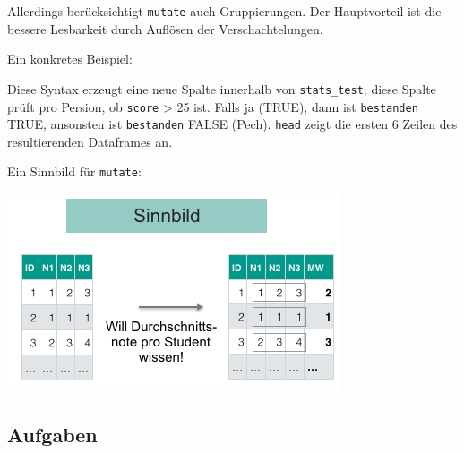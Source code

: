 \documentclass[12pt,ngerman,]{book}
\newenvironment{Shaded}{\begin{snugshade}}{\end{snugshade}}
\newcommand{\KeywordTok}[1]{\textcolor[rgb]{0.13,0.29,0.53}{\textbf{{#1}}}}
\newcommand{\DataTypeTok}[1]{\textcolor[rgb]{0.13,0.29,0.53}{{#1}}}
\newcommand{\DecValTok}[1]{\textcolor[rgb]{0.00,0.00,0.81}{{#1}}}
\newcommand{\StringTok}[1]{\textcolor[rgb]{0.31,0.60,0.02}{{#1}}}
\newcommand{\CommentTok}[1]{\textcolor[rgb]{0.56,0.35,0.01}{\textit{{#1}}}}
\newcommand{\NormalTok}[1]{{#1}}
\renewenvironment{Shaded}{\begin{kframe}}{\end{kframe}}
\begin{document}
Allerdings berücksichtigt \texttt{mutate} auch Gruppierungen. Der
Hauptvorteil ist die bessere Lesbarkeit durch Auflösen der
Verschachtelungen.

Ein konkretes Beispiel:

\begin{Shaded}
\end{Shaded}

Diese Syntax erzeugt eine neue Spalte innerhalb von
\texttt{stats\_test}; diese Spalte prüft pro Persion, ob \texttt{score}
\textgreater{} 25 ist. Falls ja (TRUE), dann ist \texttt{bestanden}
TRUE, ansonsten ist \texttt{bestanden} FALSE (Pech). \texttt{head} zeigt
die ersten 6 Zeilen des resultierenden Dataframes an.

Ein Sinnbild für \texttt{mutate}:

\begin{center}\includegraphics[width=0.7\linewidth]{images/mutate} \end{center}

\subsection{Aufgaben}\label{aufgaben-6}
\end{document}
